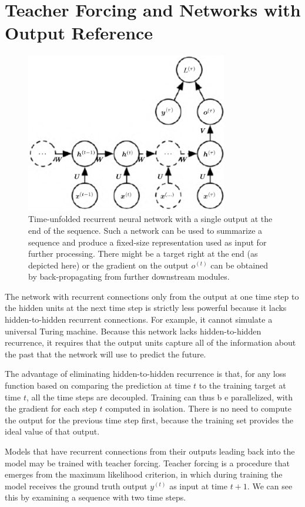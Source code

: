 \documentclass{report}
\begin{document}
\section{Teacher Forcing and Networks with Output Reference} 
\begin{figure}[ht]
	\includegraphics[width=250pt]{39}
	\centering
	\caption{Time-unfolded recurrent neural network with a single output at the end of the sequence. Such a network can be used to summarize a sequence and produce a fixed-size representation used as input for further processing. There might be a target right at the end (as depicted here) or the gradient on the output $o^{(t)}$ can be obtained by back-propagating from further downstream modules.}
\end{figure}

The network with recurrent connections only from the output at one time step to the hidden units at the next time step is strictly less powerful because it lacks hidden-to-hidden recurrent connections. For example, it cannot simulate a universal Turing machine. Because this network lacks hidden-to-hidden recurrence, it requires that the output units capture all of the information about the past that the network will use to predict the future.

The advantage of eliminating hidden-to-hidden recurrence is that, for any loss function based on comparing the prediction at time $t$ to the training target at time $t$, all the time steps are decoupled. Training can thus b e parallelized, with the gradient for each step $t$ computed in isolation. There is no need to compute the output for the previous time step first, because the training set provides the ideal value of that output.

Models that have recurrent connections from their outputs leading back into the model may be trained with teacher forcing. Teacher forcing is a procedure that emerges from the maximum likelihood criterion, in which during training the model receives the ground truth output $y^{(t)}$ as input at time $t+1$. We can see this by examining a sequence with two time steps.
\end{document}
